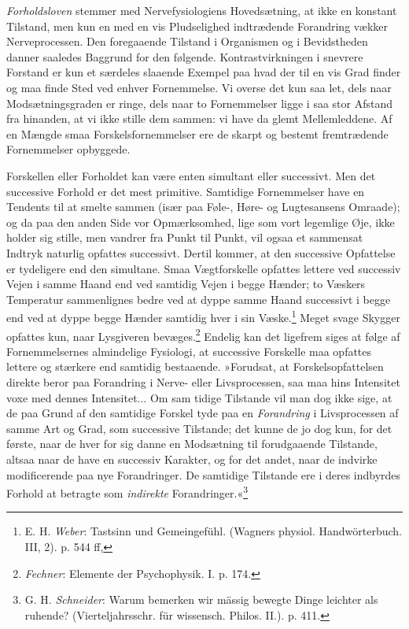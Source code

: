 \documentclass[12pt,a4paper,openany]{book}
\newcommand{\opage}[1]{\marginnote{\footnotesize\textit{[#1]}}}
\begin{document}
\emph{Forholdsloven} stemmer med Nervefysiologiens Hovedsætning, at ikke
en konstant Tilstand, men kun en med en vis Pludselighed indtrædende
Forandring vækker Nerveprocessen. Den foregaaende Tilstand i Organismen
og i Bevidstheden danner saaledes Baggrund for den følgende.
Kontrastvirkningen i snevrere Forstand er kun et særdeles slaaende
Exempel paa hvad der til en vis Grad finder og maa finde Sted ved enhver
Fornemmelse. Vi overse det kun saa let, dels naar Modsætningsgraden er
ringe, dels naar to Fornemmelser ligge i saa stor Afstand fra hinanden,
at vi ikke stille dem sammen: vi have da glemt Mellemleddene. Af en
Mængde smaa Forskelsfornemmelser ere de skarpt og bestemt fremtrædende
Fornemmelser opbyggede.

Forskellen eller Forholdet kan være enten simultant eller successivt.
Men det successive Forhold er det mest primitive. Samtidige Fornemmelser
have en Tendents til at smelte sammen (især paa Føle-, Høre- og
Lugtesansens Omraade); og da paa den anden Side vor Opmærksomhed, lige
som vort legemlige Øje, ikke holder sig stille, men vandrer fra Punkt
til Punkt, vil ogsaa et sammensat Indtryk naturlig opfattes successivt.
Dertil kommer, at den successive Opfattelse er tydeligere end den
simultane. Smaa Vægtforskelle opfattes lettere ved successiv Vejen i
samme Haand end ved samtidig Vejen i begge Hænder; to Væskers Temperatur
sammenlignes bedre ved at dyppe samme Haand successivt i begge end ved
at dyppe begge Hænder samtidig hver i sin Væske.\footnote[2]{E. H.
\emph{Weber}: Tastsinn und Gemeingefühl. (Wagners physiol.
Handwörterbuch. III, 2). p. 544 ff,} Meget svage Skygger opfattes kun,
naar Lysgiveren bevæges.\footnote[3]{\emph{Fechner}: Elemente der
Psychophysik. I. p. 174.} Endelig kan det ligefrem siges at følge af
Fornemmelsernes almindelige Fysiologi, at successive Forskelle maa
opfattes lettere og stærkere end samtidig bestaaende. »Forudsat, at
Forskelsopfattelsen direkte beror paa Forandring i Nerve- eller
Livsprocessen, saa maa hins Intensitet voxe med dennes Intensitet... Om
sam%
\opage{142}tidige Tilstande vil man dog ikke sige, at de paa Grund af
den samtidige Forskel tyde paa en \emph{Forandring} i Livsprocessen af
samme Art og Grad, som successive Tilstande; det kunne de jo dog kun,
for det første, naar de hver for sig danne en Modsætning til
forudgaaende Tilstande, altsaa naar de have en successiv Karakter, og
for det andet, naar de indvirke modificerende paa nye Forandringer. De
samtidige Tilstande ere i deres indbyrdes Forhold at betragte som
\emph{indirekte} Forandringer.«\footnote[1]{G. H. \emph{Schneider}:
Warum bemerken wir mässig bewegte Dinge leichter als ruhende?
(Vierteljahrsschr. für wissensch. Philos. II.). p. 411.}
\end{document}
